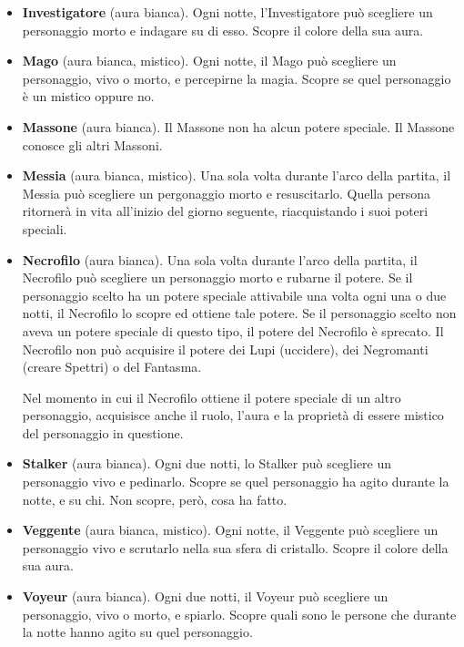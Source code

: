 \documentclass[a4paper,10pt]{article}
\begin{document}
\begin{itemize}
 \item {\bf Investigatore} (aura bianca). Ogni notte, l'Investigatore può scegliere un personaggio morto e indagare su di esso. Scopre il colore della sua aura.

 \item {\bf Mago} (aura bianca, mistico). Ogni notte, il Mago può scegliere un personaggio, vivo o morto, e percepirne la magia. Scopre se quel personaggio è un mistico oppure no.
 
 \item {\bf Massone} (aura bianca). Il Massone non ha alcun potere speciale. Il Massone conosce gli altri Massoni.
 
 \item {\bf Messia} (aura bianca, mistico). Una sola volta durante l'arco della partita, il Messia può scegliere un pergonaggio morto e resuscitarlo. Quella persona ritornerà in vita all'inizio del giorno seguente, riacquistando i suoi poteri speciali.


 \item {\bf Necrofilo} (aura bianca). Una sola volta durante l'arco della partita, il Necrofilo può scegliere un personaggio morto e rubarne il potere. 
 Se il personaggio scelto ha un potere speciale attivabile una volta ogni una o due notti, il Necrofilo lo scopre ed ottiene tale potere.
 Se il personaggio scelto non aveva un potere speciale di questo tipo, il potere del Necrofilo è sprecato.
 Il Necrofilo non può acquisire il potere dei Lupi (uccidere), dei Negromanti (creare Spettri) o del Fantasma.
 
 Nel momento in cui il Necrofilo ottiene il potere speciale di un altro personaggio, acquisisce anche il ruolo, l'aura e la proprietà di essere mistico del personaggio in questione.

 \item {\bf Stalker} (aura bianca). Ogni due notti, lo Stalker può scegliere un personaggio vivo e pedinarlo. Scopre se quel personaggio ha agito durante la notte, e su chi. Non scopre, però, cosa ha fatto.
 
 \item {\bf Veggente} (aura bianca, mistico). Ogni notte, il Veggente può scegliere un personaggio vivo e scrutarlo nella sua sfera di cristallo. Scopre il colore della sua aura.

 \item {\bf Voyeur} (aura bianca). Ogni due notti, il Voyeur può scegliere un personaggio, vivo o morto, e spiarlo. Scopre quali sono le persone che durante la notte hanno agito su quel personaggio.
 

\end{itemize}
\end{document}
